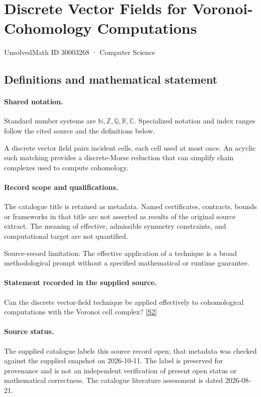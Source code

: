 \documentclass[11pt]{article}
\newcommand{\sref}[2]{\hyperlink{source:#1:#2}{[S#2]}}
\begin{document}
\setcounter{section}{30003267}
\section{Discrete Vector Fields for Voronoi-Cohomology Computations}\label{30003268}
{\small\sffamily UnsolvedMath ID 30003268 · Computer Science}
\subsection{Definitions and mathematical statement}

\paragraph{Shared notation.}Standard number systems are $\mathbb N,\mathbb Z,\mathbb Q,\mathbb R,\mathbb C$. Specialized notation and index ranges follow the cited source and the definitions below.


A discrete vector field pairs incident cells, each cell used at most once. An acyclic such matching provides a discrete-Morse reduction that can simplify chain complexes used to compute cohomology.
\paragraph{Record scope and qualifications.}
The catalogue title is retained as metadata. Named certificates, contracts, bounds or frameworks in that title are not asserted as results of the original source extract.
The meaning of effective, admissible symmetry constraints, and computational target are not quantified.

Source-record limitation: The effective application of a technique is a broad methodological prompt without a specified mathematical or runtime guarantee.
\paragraph{Statement recorded in the supplied source.}
Can the discrete vector-field technique be applied effectively to cohomological computations with the Voronoi cell complex? \sref{30003268}{2}
\paragraph{Source status.}
The supplied catalogue labels this source record open; that metadata was checked against the supplied snapshot on 2026-10-11. The label is preserved for provenance and is not an independent verification of present open status or mathematical correctness. The catalogue literature assessment is dated 2026-08-21.
\end{document}
